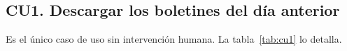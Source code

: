 \newcommand{\cucampo}[2]{\textbf{#1} & #2 \\ \midrule}
\newenvironment{cupasos}
  {\begin{list}{\arabic{cupaso}.}{\usecounter{cupaso}\setlength{\leftmargin}{1.5em}\setlength{\labelwidth}{1.2em}%
    \setlength{\topsep}{0pt}\setlength{\partopsep}{0pt}\setlength{\itemsep}{0pt}\setlength{\parsep}{0pt}}}
  {\end{list}}
\newenvironment{cualternativos}
  {\begin{list}{}{\setlength{\leftmargin}{2.2em}\setlength{\labelwidth}{2em}%
    \setlength{\topsep}{0pt}\setlength{\partopsep}{0pt}\setlength{\itemsep}{0pt}\setlength{\parsep}{0pt}}}
  {\end{list}}

\subsection{CU1. Descargar los boletines del día anterior}
\label{sec:cu1}

Es el único caso de uso sin intervención humana. La tabla~\ref{tab:cu1} lo detalla.


